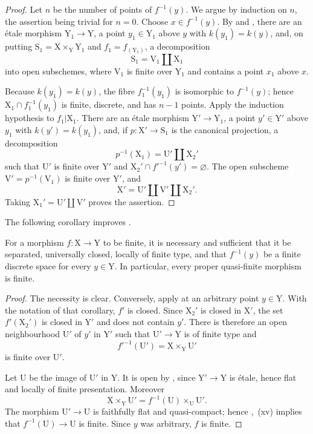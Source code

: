 \begin{proof}
Let $n$ be the number of points of $f^{-1}(y)$. We argue by induction on $n$, the assertion being trivial for $n=0$. Choose $x\in f^{-1}(y)$. By  and , there are an \'etale morphism $\mathrm{Y}_1\to\mathrm{Y}$, a point $y_1\in\mathrm{Y}_1$ above $y$ with $k(y_1)=k(y)$, and, on putting $\mathrm{S}_1=\mathrm{X}\times_{\mathrm{Y}}\mathrm{Y}_1$ and $f_1=f_{(\mathrm{Y}_1)}$, a decomposition
\[
  \mathrm{S}_1=\mathrm{V}_1\amalg\mathrm{X}_1
\]
into open subschemes, where $\mathrm{V}_1$ is finite over $\mathrm{Y}_1$ and contains a point $x_1$ above $x$.

Because $k(y_1)=k(y)$, the fibre $f_1^{-1}(y_1)$ is isomorphic to $f^{-1}(y)$; hence $\mathrm{X}_1\cap f_1^{-1}(y_1)$ is finite, discrete, and has $n-1$ points. Apply the induction hypothesis to $f_1|\mathrm{X}_1$. There are an \'etale morphism $\mathrm{Y}'\to\mathrm{Y}_1$, a point $y'\in\mathrm{Y}'$ above $y_1$ with $k(y')=k(y_1)$, and, if $p:\mathrm{X}'\to\mathrm{S}_1$ is the canonical projection, a decomposition
\[
  p^{-1}(\mathrm{X}_1)=\mathrm{U}'\amalg\mathrm{X}_2'
\]
such that $\mathrm{U}'$ is finite over $\mathrm{Y}'$ and $\mathrm{X}_2'\cap f'^{-1}(y')=\varnothing$. The open subscheme $\mathrm{V}'=p^{-1}(\mathrm{V}_1)$ is finite over $\mathrm{Y}'$, and
\[
  \mathrm{X}'=\mathrm{U}'\amalg\mathrm{V}'\amalg\mathrm{X}_2'.
\]
Taking $\mathrm{X}_1'=\mathrm{U}'\amalg\mathrm{V}'$ proves the assertion.
\end{proof}

The following corollary improves .

\begin{corollary}[18.12.4]
\label{IV.18.12.4}
For a morphism $f:\mathrm{X}\to\mathrm{Y}$ to be finite, it is necessary and sufficient that it be separated, universally closed, locally of finite type, and that $f^{-1}(y)$ be a finite discrete space for every $y\in\mathrm{Y}$. In particular, every proper quasi-finite morphism is finite.
\end{corollary}

\begin{proof}
The necessity is clear. Conversely, apply  at an arbitrary point $y\in\mathrm{Y}$. With the notation of that corollary, $f'$ is closed. Since $\mathrm{X}_2'$ is closed in $\mathrm{X}'$, the set $f'(\mathrm{X}_2')$ is closed in $\mathrm{Y}'$ and does not contain $y'$. There is therefore an open neighbourhood $\mathrm{U}'$ of $y'$ in $\mathrm{Y}'$ such that $\mathrm{U}'\to\mathrm{Y}$ is of finite type and
\[
  f'^{-1}(\mathrm{U}')=\mathrm{X}\times_{\mathrm{Y}}\mathrm{U}'
\]
is finite over $\mathrm{U}'$.

Let $\mathrm{U}$ be the image of $\mathrm{U}'$ in $\mathrm{Y}$. It is open by , since $\mathrm{Y}'\to\mathrm{Y}$ is \'etale, hence flat and locally of finite presentation. Moreover
\[
  \mathrm{X}\times_{\mathrm{Y}}\mathrm{U}'
  =f^{-1}(\mathrm{U})\times_{\mathrm{U}}\mathrm{U}'.
\]
The morphism $\mathrm{U}'\to\mathrm{U}$ is faithfully flat and quasi-compact; hence ,~(xv) implies that $f^{-1}(\mathrm{U})\to\mathrm{U}$ is finite. Since $y$ was arbitrary, $f$ is finite.
\end{proof}


